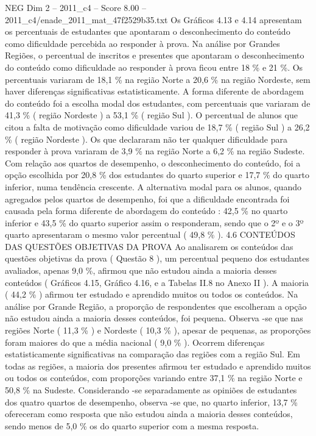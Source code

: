 \begin{textsample}{NEG Dim 2 – 2011\_c4 – Score 8.00 – 2011\_c4/enade\_2011\_mat\_47f2529b35.txt}
Os Gráficos 4.13 e 4.14 apresentam os percentuais de estudantes que apontaram o desconhecimento do conteúdo como dificuldade percebida ao responder à prova.
Na análise por Grandes Regiões, o percentual de inscritos e presentes que apontaram o desconhecimento do conteúdo como dificuldade ao responder à prova ficou entre 18 \% e 21 \%.
Os percentuais variaram de 18,1 \% na região Norte a 20,6 \% na região Nordeste, sem haver diferenças significativas estatisticamente.
A forma diferente de abordagem do conteúdo foi a escolha modal dos estudantes, com percentuais que variaram de 41,3 \% ( região Nordeste ) a 53,1 \% ( região Sul ).
O percentual de alunos que citou a falta de motivação como dificuldade variou de 18,7 \% ( região Sul ) a 26,2 \% ( região Nordeste ).
Os que declararam não ter qualquer dificuldade para responder à prova variaram de 3,9 \% na região Norte a 6,2 \% na região Sudeste.
Com relação aos quartos de desempenho, o desconhecimento do conteúdo, foi a opção escolhida por 20,8 \% dos estudantes do quarto superior e 17,7 \% do quarto inferior, numa tendência crescente.
A alternativa modal para os alunos, quando agregados pelos quartos de desempenho, foi que a dificuldade encontrada foi causada pela forma diferente de abordagem do conteúdo : 42,5 \% no quarto inferior e 43,5 \% do quarto superior assim o responderam, sendo que o 2º e o 3º quarto apresentaram o mesmo valor percentual ( 49,8 \% ). 4.6 CONTEÚDOS DAS QUESTÕES OBJETIVAS DA PROVA Ao analisarem os conteúdos das questões objetivas da prova ( Questão 8 ), um percentual pequeno dos estudantes avaliados, apenas 9,0 \%, afirmou que não estudou ainda a maioria desses conteúdos ( Gráficos 4.15, Gráfico 4.16, e a Tabelas II.8 no Anexo II ).
A maioria ( 44,2 \% ) afirmou ter estudado e aprendido muitos ou todos os conteúdos.
Na análise por Grande Região, a proporção de respondentes que escolheram a opção não estudou ainda a maioria desses conteúdos, foi pequena.
Observa -se que nas regiões Norte ( 11,3 \% ) e Nordeste ( 10,3 \% ), apesar de pequenas, as proporções foram maiores do que a média nacional ( 9,0 \% ).
Ocorrem diferenças estatisticamente significativas na comparação das regiões com a região Sul.
Em todas as regiões, a maioria dos presentes afirmou ter estudado e aprendido muitos ou todos os conteúdos, com proporções variando entre 37,1 \% na região Norte e 50,8 \% na Sudeste.
Considerando -se separadamente as opiniões de estudantes dos quatro quartos de desempenho, observa -se que, no quarto inferior, 13,7 \% ofereceram como resposta que não estudou ainda a maioria desses conteúdos, sendo menos de 5,0 \% os do quarto superior com a mesma resposta.

\end{textsample}
